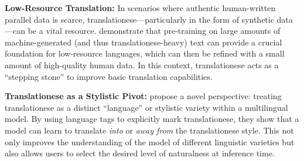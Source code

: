 \documentclass[11pt,a4paper]{article}
\begin{document}
\textbf{Low-Resource Translation:} In scenarios where authentic human-written parallel data is scarce, translationese—particularly in the form of synthetic data—can be a vital resource. \citet{dabre2024pretraining} demonstrate that pre-training on large amounts of machine-generated (and thus translationese-heavy) text can provide a crucial foundation for low-resource languages, which can then be refined with a small amount of high-quality human data. In this context, translationese acts as a ``stepping stone'' to improve basic translation capabilities.

\textbf{Translationese as a Stylistic Pivot:} \citet{riley2020translationese} propose a novel perspective: treating translationese as a distinct ``language'' or stylistic variety within a multilingual model. By using language tags to explicitly mark translationese, they show that a model can learn to translate \textit{into} or \textit{away from} the translationese style. This not only improves the understanding of the model of different linguistic varieties but also allows users to select the desired level of naturalness at inference time.
\end{document}
